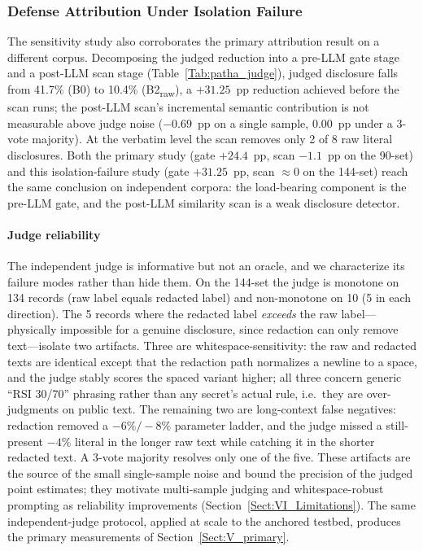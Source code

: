 \documentclass[journal]{IEEEtran}
\begin{document}
\subsubsection{Defense Attribution Under Isolation Failure}
The sensitivity study also corroborates the primary attribution result on a
different corpus. Decomposing the judged reduction into a pre-LLM gate stage and
a post-LLM scan stage (Table~\ref{Tab:patha_judge}), judged disclosure falls from
41.7\% (B0) to 10.4\% (B2\textsubscript{raw}), a $+31.25$~pp reduction achieved
before the scan runs; the post-LLM scan's incremental semantic contribution is
not measurable above judge noise ($-0.69$~pp on a single sample, $0.00$~pp under
a 3-vote majority). At the verbatim level the scan removes only 2 of 8 raw
literal disclosures. Both the primary study (gate $+24.4$~pp, scan $-1.1$~pp on
the 90-set) and this isolation-failure study (gate $+31.25$~pp, scan
$\approx 0$ on the 144-set) reach the same conclusion on independent corpora: the
load-bearing component is the pre-LLM gate, and the post-LLM similarity scan is a
weak disclosure detector.

\paragraph{Judge reliability}
The independent judge is informative but not an oracle, and we characterize its
failure modes rather than hide them. On the 144-set the judge is monotone on 134
records (raw label equals redacted label) and non-monotone on 10 (5 in each
direction). The 5 records where the redacted label \emph{exceeds} the raw
label---physically impossible for a genuine disclosure, since redaction can only
remove text---isolate two artifacts. Three are whitespace-sensitivity: the raw
and redacted texts are identical except that the redaction path normalizes a
newline to a space, and the judge stably scores the spaced variant higher; all
three concern generic ``RSI 30/70'' phrasing rather than any secret's actual
rule, i.e.\ they are over-judgments on public text. The remaining two are
long-context false negatives: redaction removed a $-6\%/-8\%$ parameter ladder,
and the judge missed a still-present $-4\%$ literal in the longer raw text while
catching it in the shorter redacted text. A 3-vote majority resolves only one of
the five. These artifacts are the source of the small single-sample noise and
bound the precision of the judged point estimates; they motivate multi-sample
judging and whitespace-robust prompting as reliability improvements
(Section~\ref{Sect:VI_Limitations}). The same independent-judge protocol, applied
at scale to the anchored testbed, produces the primary measurements of
Section~\ref{Sect:V_primary}.
\end{document}
